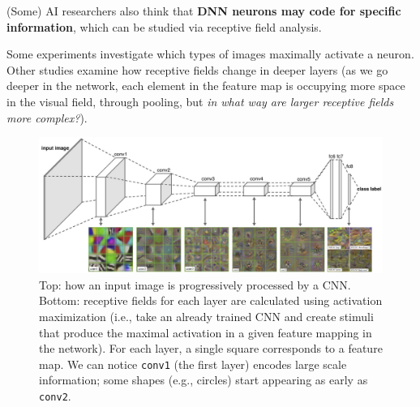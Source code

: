 (Some) AI researchers also think that \textbf{DNN neurons may code for specific information}, which can be studied via receptive field analysis.

Some experiments investigate which types of images maximally activate a neuron. Other studies examine how receptive fields change in deeper layers (as we go deeper in the network, each element in the feature map is occupying more space in the visual field, through pooling, but \textit{in what way are larger receptive fields more complex?}).
\begin{figure}
    \centering
    \captionsetup{width=.8\linewidth}
    \includegraphics[width=1\linewidth]{images/dnn_receptive_fields.png}
    \caption{Top: how an input image is progressively processed by a CNN. Bottom: receptive fields for each layer are calculated using activation maximization (i.e., take an already trained CNN and create stimuli that produce the maximal activation in a given feature mapping in the network). For each layer, a single square corresponds to a feature map. We can notice \texttt{conv1} (the first layer) encodes large scale information; some shapes (e.g., circles) start appearing as early as \texttt{conv2}.}
\end{figure}


